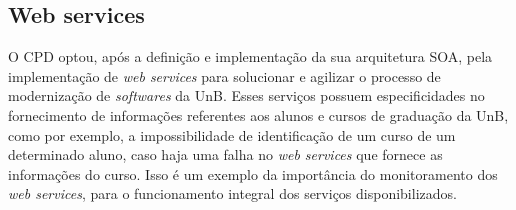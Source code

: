 
\subsection{Web services}

O CPD optou, após a definição e implementação da sua arquitetura SOA, pela implementação de \textit{web services} para solucionar e agilizar o processo de modernização de \textit{softwares} da UnB. Esses serviços possuem especificidades no fornecimento de informações referentes aos alunos e cursos de graduação da UnB,  como por exemplo, a impossibilidade de identificação de um curso de um determinado aluno, caso haja uma falha no \textit{web services} que fornece as informações do curso. Isso é um exemplo da importância do monitoramento dos \textit{web services}, para o funcionamento integral dos serviços disponibilizados.   


